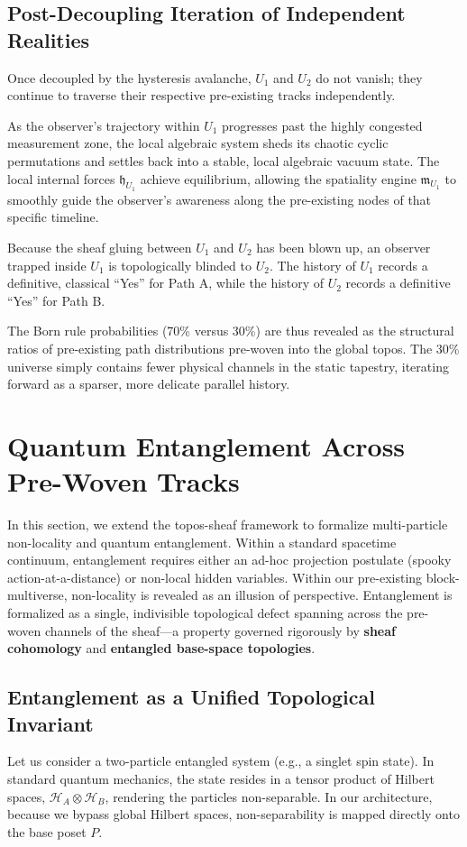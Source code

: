 \documentclass[12pt,letterpaper]{article}
\begin{document}
\subsection{Post-Decoupling Iteration of Independent Realities}
Once decoupled by the hysteresis avalanche, $U_1$ and $U_2$ do not vanish; they continue to traverse their respective pre-existing tracks independently.

As the observer's trajectory within $U_1$ progresses past the highly congested measurement zone, the local algebraic system sheds its chaotic cyclic permutations and settles back into a stable, local algebraic vacuum state. The local internal forces $\mathfrak{h}_{U_1}$ achieve equilibrium, allowing the spatiality engine $\mathfrak{m}_{U_1}$ to smoothly guide the observer's awareness along the pre-existing nodes of that specific timeline.

Because the sheaf gluing between $U_1$ and $U_2$ has been blown up, an observer trapped inside $U_1$ is topologically blinded to $U_2$. The history of $U_1$ records a definitive, classical ``Yes'' for Path A, while the history of $U_2$ records a definitive ``Yes'' for Path B.

The Born rule probabilities (70\% versus 30\%) are thus revealed as the structural ratios of pre-existing path distributions pre-woven into the global topos. The 30\% universe simply contains fewer physical channels in the static tapestry, iterating forward as a sparser, more delicate parallel history.

\section{Quantum Entanglement Across Pre-Woven Tracks}

In this section, we extend the topos-sheaf framework to formalize multi-particle non-locality and quantum entanglement. Within a standard spacetime continuum, entanglement requires either an ad-hoc projection postulate (spooky action-at-a-distance) or non-local hidden variables. Within our pre-existing block-multiverse, non-locality is revealed as an illusion of perspective. Entanglement is formalized as a single, indivisible topological defect spanning across the pre-woven channels of the sheaf---a property governed rigorously by \textbf{sheaf cohomology} and \textbf{entangled base-space topologies}.

\subsection{Entanglement as a Unified Topological Invariant}
Let us consider a two-particle entangled system (e.g., a singlet spin state). In standard quantum mechanics, the state resides in a tensor product of Hilbert spaces, $\mathcal{H}_A \otimes \mathcal{H}_B$, rendering the particles non-separable. In our architecture, because we bypass global Hilbert spaces, non-separability is mapped directly onto the base poset $P$.
\end{document}
